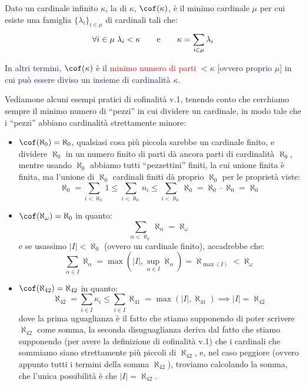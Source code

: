\documentclass[11pt]{scrartcl}
\begin{document}
\begin{definition}[Cofinalità - v.1]
	Dato un cardinale infinito $\kappa$, la  di $\kappa$, $\cof(\kappa)$, è il minimo cardinale 
	$\mu$ per cui esiste una famiglia $\{\lambda_i\}_{i \in \mu}$ di cardinali tali che:
	\[ \forall i \in \mu \; \lambda_i < \kappa \qquad \text e \qquad \kappa = \sum_{i \in \mu} \lambda_i
		\]
\end{definition}

\textcolor{MidnightBlue}{In altri termini, $\cof(\kappa)$ è il \textcolor{red}{minimo numero di parti} $<\kappa$ [ovvero proprio $\mu$] in cui può essere diviso un insieme di cardinalità $\kappa$.}

\begin{example}
	Vediamone alcuni esempi pratici di cofinalità v.1, tenendo conto che cerchiamo sempre il minimo numero di ``pezzi'' in cui dividere un cardinale, in modo tale che i ``pezzi'' abbiano cardinalità strettamente minore:
	\begin{itemize}
		\item $\cof(\aleph_0) = \aleph_0$, qualsiasi cosa più piccola sarebbe un cardinale finito, e dividere $\aleph_0$ in un numero finito di parti dà ancora parti di cardinalità $\aleph_0$, mentre usando $\aleph_0$ abbiamo tutti ``pezzettini'' finiti, la cui unione finita è finita, ma l'unione di $\aleph_0$ cardinali finiti dà proprio $\aleph_0$ per le proprietà viste:
		\[ \aleph_0 = \sum_{i < \aleph_0} 1 \leq \sum_{i < \aleph_0} n_i \leq \sum_{i < \aleph_0} \aleph_0 = \aleph_0 \cdot \aleph_0 = \aleph_0
			\]
		\item $\cof(\aleph_\omega) = \aleph_0$ in quanto:
		\[ \sum_{\alpha < \aleph_0} \aleph_\alpha = \aleph_\omega
			\]
		e se usassimo $|I|<\aleph_0$ (ovvero un cardinale finito), accadrebbe che:
		\[\sum_{\alpha \in I} \aleph_\alpha = \max\left(|I|,\sup_{\alpha \in I} \aleph_\alpha\right) = \aleph_{\max(I)} < \aleph_\omega
		\]
		\item $\cof(\aleph_{42}) = \aleph_{42}$ in quanto:
		\[ \aleph_{42} = \sum_{i \in I} \kappa_i \leq \sum_{i \in I} \aleph_{41} = \max\left(|I|,\aleph_{41}\right) \implies |I| = \aleph_{42}
			\]
		dove la prima uguaglianza è il fatto che stiamo supponendo di poter scrivere $\aleph_{42}$ come somma, la seconda disuguaglianza deriva dal fatto che stiamo supponendo (per avere la definizione di cofinalità v.1) che i cardinali che sommiamo siano strettamente più piccoli di $\aleph_{42}$, e, nel caso peggiore (ovvero appunto tutti i termini della somma $\aleph_{42}$), troviamo calcolando la somma, che 
		l'unica possibilità è che $|I| = \aleph_{42}$.
	\end{itemize}
\end{example}
\end{document}
